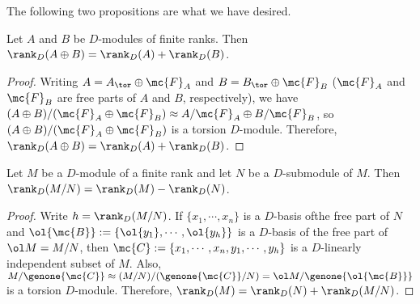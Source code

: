 The following two propositions are what we have desired.
\begin{prop}
    Let $A$ and $B$ be $D$-modules of finite ranks.
    Then $\rank_D(A\oplus B)=\rank_D(A)+\rank_D(B)$.
\end{prop}
\begin{proof}
    Writing $A=A_\tor\oplus\mc{F}_A$ and $B=B_\tor\oplus\mc{F}_B$ ($\mc{F}_A$ and $\mc{F}_B$ are free parts of $A$ and $B$, respectively), we have $(A\oplus B)/(\mc{F}_A\oplus\mc{F}_B)\approx A/\mc{F}_A\oplus B/\mc{F}_B$, so $(A\oplus B)/(\mc{F}_A\oplus\mc{F}_B)$ is a torsion $D$-module.
    Therefore, $\rank_D(A\oplus B)=\rank_D(A)+\rank_D(B)$.
\end{proof}

\begin{prop}
    Let $M$ be a $D$-module of a finite rank and let $N$ be a $D$-submodule of $M$.
    Then $\rank_D(M/N)=\rank_D(M)-\rank_D(N)$.
\end{prop}
\begin{proof}
    Write $h=\rank_D(M/N)$.
    If $\{x_1, \cdots, x_n\}$ is a $D$-basis ofthe free part of $N$ and $\ol{\mc{B}}:=\{\ol{y_1}, \cdots, \ol{y_h}\}$ is a $D$-basis of the free part of $\ol M=M/N$, then $\mc{C}:=\{x_1, \cdots, x_n, y_1, \cdots, y_h\}$ is a $D$-linearly independent subset of $M$.
    Also, $M/\genone{\mc{C}}\approx (M/N)/(\genone{\mc{C}}/N)= \ol M/\genone{\ol{\mc{B}}}$ is a torsion $D$-module.
    Therefore, $\rank_D(M)=\rank_D(N)+\rank_D(M/N)$.
\end{proof}